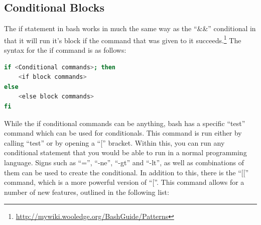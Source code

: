 \documentclass[a4paper,11pt]{report}
\begin{document}
		\subsection{Conditional Blocks}
			The if statement in bash works in much the same way as the ``\&\&'' conditional in that it will run it's block if the command that was given to it succeeds.\footnote{\url{http://mywiki.wooledge.org/BashGuide/Patterns}} 
			The syntax for the if command is as follows:
			\begin{lstlisting}[language={bash},numbers={none}]
if <Conditional commands>; then 
	<if block commands> 
else 
	<else block commands> 
fi
			\end{lstlisting}
			While the if conditional commands can be anything, bash has a specific ``test'' command which can be used for conditionals. 
			This command is run either by calling ``test'' or by opening a ``['' bracket. 
			Within this, you can run any conditional statement that you would be able to run in a normal programming language. 
			Signs such as ``='', ``-ne'', ``-gt'' and ``-lt'', as well as combinations of them can be used to create the conditional. 
			In addition to this, there is the ``[['' command, which is a more powerful version of ``[''.
			This command allows for a number of new features, outlined in the following list:
\end{document}
